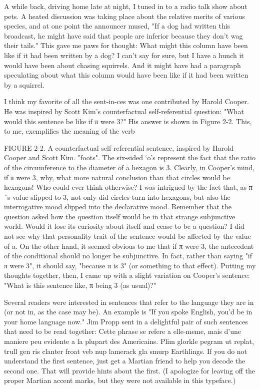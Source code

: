 A while back, driving home late at night, I tuned in to a radio talk show about pets. A heated discussion was taking place about the relative merits of various species, and at one point the announcer mused, "If a dog had written this broadcast, he might have said that people are inferior because they don't wag their tails." This gave me paws for thought: What might this column have been like if it had been written by a dog? I can't say for sure, but I have a hunch it would have been about chasing squirrels. And it might have had a paragraph speculating about what this column would have been like if it had been written by a squirrel. 
\separator

I think my favorite of all the sent-in-ces was one contributed by Harold Cooper. He was inspired by Scott Kim's counterfactual self-referential question: "What would this sentence be like if π were 3?" His answer is shown in Figure 2-2. This, to me, exemplifies the meaning of the verb 



FIGURE 2-2. A counterfactual self-referential sentence, inspired by Harold Cooper and Scott Kim. 
"foots". The six-sided `o's represent the fact that the ratio of the circumference to the diameter of a hexagon is 3. Clearly, in Cooper's mind, if π were 3, why, what more natural conclusion than that circles would be hexagons! Who could ever think otherwise? I was intrigued by the fact that, as π´s value slipped to 3, not only did circles turn into hexagons, but also the interrogative mood slipped into the declarative mood. Remember that the question asked how the question itself would be in that strange subjunctive world. Would it lose its curiosity about itself and cease to be a question? I did not see why that personality trait of the sentence would be affected by the value of a. On the other hand, it seemed obvious to me that if π were 3, the antecedent of the conditional should no longer be subjunctive. In fact, rather than saying "if π were 3", it should say, "because π is 3" (or something to that effect). Putting my thoughts together, then, I came up with a slight variation on Cooper's sentence: "What is this sentence like, π being 3 (as usual)?" 



Several readers were interested in sentences that refer to the language they are in (or not in, as the case may be). An example is "If you spoke English, you'd be in your home language now." Jim Propp sent in a delightful pair of such sentences that need to be read together: 
Cette phrase se refere a elle-meme, mais d'une maniere peu evidente a la plupart des Americains. 
Plim glorkle pegram ut replat, trull gen ris clanter froat veb nup lamerack gla smurp Earthlings. 
If you do not understand the first sentence, just get a Martian friend to help you decode the second one. That will provide hints about the first. (I apologize for leaving off the proper Martian accent marks, but they were not available in this typeface.) 
\separator


